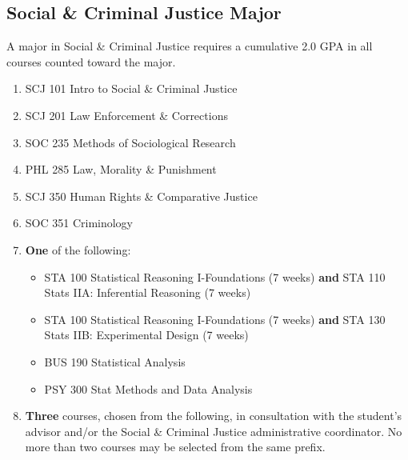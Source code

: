 \documentclass[
  letterpaper,
]{scrbook}
\providecommand{\tightlist}{%
  \setlength{\itemsep}{0pt}\setlength{\parskip}{0pt}}
\begin{document}
\subsection{Social \& Criminal Justice
Major}\label{social-criminal-justice-major}

A major in Social \& Criminal Justice requires a cumulative 2.0 GPA in
all courses counted toward the major.

\begin{enumerate}
\def\labelenumi{\arabic{enumi}.}
\item
  SCJ 101 Intro to Social \& Criminal Justice
\item
  SCJ 201 Law Enforcement \& Corrections
\item
  SOC 235 Methods of Sociological Research
\item
  PHL 285 Law, Morality \& Punishment
\item
  SCJ 350 Human Rights \& Comparative Justice
\item
  SOC 351 Criminology
\item
  \textbf{One} of the following:

  \begin{itemize}
  \tightlist
  \item
    STA 100 Statistical Reasoning I-Foundations (7 weeks) \textbf{and}
    STA 110 Stats IIA: Inferential Reasoning (7 weeks)
  \item
    STA 100 Statistical Reasoning I-Foundations (7 weeks) \textbf{and}
    STA 130 Stats IIB: Experimental Design (7 weeks)
  \item
    BUS 190 Statistical Analysis
  \item
    PSY 300 Stat Methods and Data Analysis
  \end{itemize}
\item
  \textbf{Three} courses, chosen from the following, in consultation
  with the student's advisor and/or the Social \& Criminal Justice
  administrative coordinator. No more than two courses may be selected
  from the same prefix.


\end{enumerate}
\end{document}
